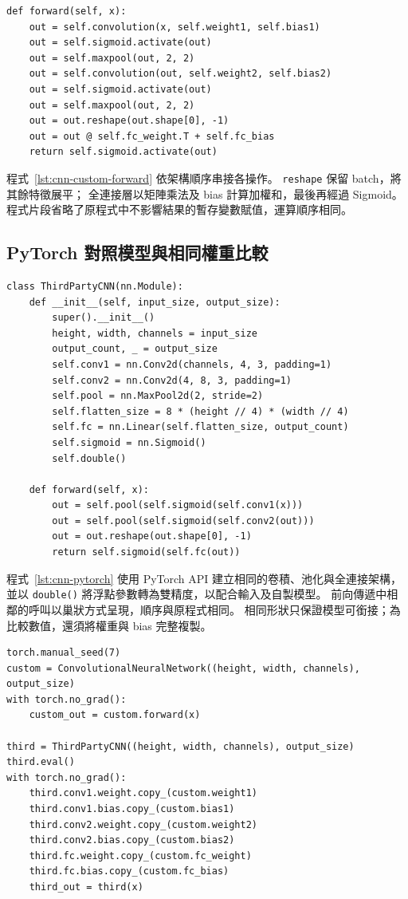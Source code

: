 \begin{lstlisting}[caption={自製 CNN 的前向傳遞},label={lst:cnn-custom-forward}]
def forward(self, x):
    out = self.convolution(x, self.weight1, self.bias1)
    out = self.sigmoid.activate(out)
    out = self.maxpool(out, 2, 2)
    out = self.convolution(out, self.weight2, self.bias2)
    out = self.sigmoid.activate(out)
    out = self.maxpool(out, 2, 2)
    out = out.reshape(out.shape[0], -1)
    out = out @ self.fc_weight.T + self.fc_bias
    return self.sigmoid.activate(out)
\end{lstlisting}

程式~\ref{lst:cnn-custom-forward} 依架構順序串接各操作。
\texttt{reshape} 保留 batch，將其餘特徵展平；
全連接層以矩陣乘法及 bias 計算加權和，最後再經過 Sigmoid。
程式片段省略了原程式中不影響結果的暫存變數賦值，運算順序相同。

\subsection{PyTorch 對照模型與相同權重比較}

\begin{lstlisting}[caption={PyTorch 對照模型},label={lst:cnn-pytorch}]
class ThirdPartyCNN(nn.Module):
    def __init__(self, input_size, output_size):
        super().__init__()
        height, width, channels = input_size
        output_count, _ = output_size
        self.conv1 = nn.Conv2d(channels, 4, 3, padding=1)
        self.conv2 = nn.Conv2d(4, 8, 3, padding=1)
        self.pool = nn.MaxPool2d(2, stride=2)
        self.flatten_size = 8 * (height // 4) * (width // 4)
        self.fc = nn.Linear(self.flatten_size, output_count)
        self.sigmoid = nn.Sigmoid()
        self.double()

    def forward(self, x):
        out = self.pool(self.sigmoid(self.conv1(x)))
        out = self.pool(self.sigmoid(self.conv2(out)))
        out = out.reshape(out.shape[0], -1)
        return self.sigmoid(self.fc(out))
\end{lstlisting}

程式~\ref{lst:cnn-pytorch} 使用 PyTorch API 建立相同的卷積、池化與全連接架構，
並以 \texttt{double()} 將浮點參數轉為雙精度，以配合輸入及自製模型。
前向傳遞中相鄰的呼叫以巢狀方式呈現，順序與原程式相同。
相同形狀只保證模型可銜接；為比較數值，還須將權重與 bias 完整複製。

\begin{lstlisting}[caption={建立模型、複製權重並計算兩組輸出},label={lst:cnn-copy-weights}]
torch.manual_seed(7)
custom = ConvolutionalNeuralNetwork((height, width, channels), output_size)
with torch.no_grad():
    custom_out = custom.forward(x)

third = ThirdPartyCNN((height, width, channels), output_size)
third.eval()
with torch.no_grad():
    third.conv1.weight.copy_(custom.weight1)
    third.conv1.bias.copy_(custom.bias1)
    third.conv2.weight.copy_(custom.weight2)
    third.conv2.bias.copy_(custom.bias2)
    third.fc.weight.copy_(custom.fc_weight)
    third.fc.bias.copy_(custom.fc_bias)
    third_out = third(x)
\end{lstlisting}

